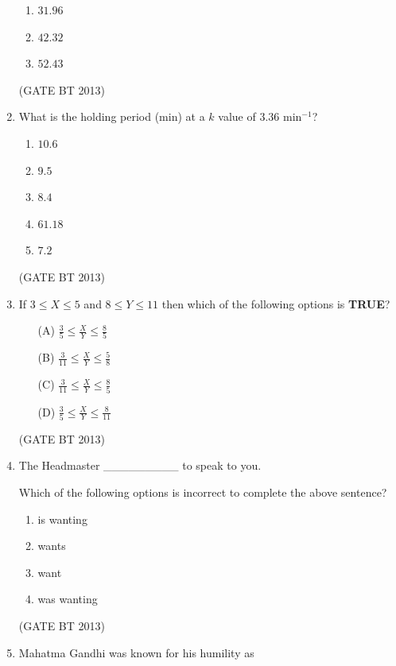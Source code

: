 \documentclass[journal,12pt,onecolumn]{IEEEtran}
\theoremstyle{remark}
\begin{document}
\begin{enumerate}
\begin{enumerate}
    \item $31.96$
    \item $42.32$
    \item $52.43$
\end{enumerate} \hfill(GATE BT 2013)

\item 

What is the holding period (min) at a \(k\) value of \(3.36 \text{ min}^{-1}\)?

\begin{enumerate}
    \item $10.6$
    \item $9.5$
    \item $8.4$
    \item $61.18$
    \item $7.2$
\end{enumerate} \hfill(GATE BT 2013)

\item 
If \(3 \le X \le 5\) and \(8 \le Y \le 11\) then which of the following options is \textbf{TRUE}?

\begin{enumerate}
    \item[(A)] \(\frac{3}{5} \le \frac{X}{Y} \le \frac{8}{5}\)
    \item[(B)] \(\frac{3}{11} \le \frac{X}{Y} \le \frac{5}{8}\)
    \item[(C)] \(\frac{3}{11} \le \frac{X}{Y} \le \frac{8}{5}\)
    \item[(D)] \(\frac{3}{5} \le \frac{X}{Y} \le \frac{8}{11}\)
\end{enumerate} \hfill(GATE BT 2013)

\item 

The Headmaster \_\_\_\_\_\_\_\_\_ to speak to you. 

Which of the following options is incorrect to complete the above sentence?

\begin{enumerate}
    \item is wanting
    \item wants
    \item want
    \item was wanting
\end{enumerate} \hfill(GATE BT 2013)

\item 

Mahatma Gandhi was known for his humility as


\end{enumerate}
\end{document}
